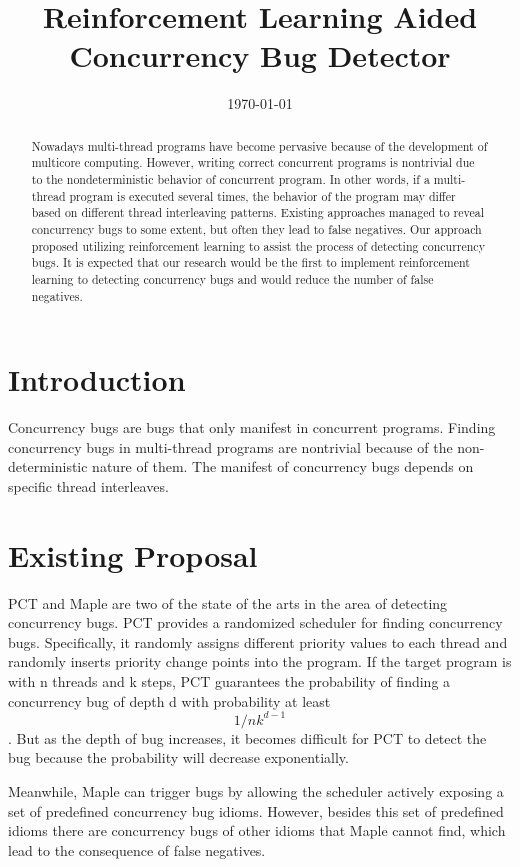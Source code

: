 \documentclass[twocolumn]{article}
\title{Reinforcement Learning Aided Concurrency Bug Detector}
\date{\today}
\begin{document}
\maketitle

\begin{abstract}
Nowadays multi-thread programs have become pervasive because of the development of multicore computing. However, writing correct concurrent programs is nontrivial due to the nondeterministic behavior of concurrent program. In other words, if a multi-thread program is executed several times, the behavior of the program may differ based on different thread interleaving patterns. Existing approaches managed to reveal concurrency bugs to some extent, but often they lead to false negatives. Our approach proposed utilizing reinforcement learning to assist the process of detecting concurrency bugs. It is expected that our research would be the first to implement reinforcement learning to detecting concurrency bugs and would reduce the number of false negatives. 
\end{abstract}

\section{Introduction}
Concurrency bugs are bugs that only manifest in concurrent programs. Finding concurrency bugs in multi-thread programs are nontrivial because of the non-deterministic nature of them. The manifest of concurrency bugs depends on specific thread interleaves. 

\section{Existing Proposal}
PCT and Maple are two of the state of the arts in the area of detecting concurrency bugs. PCT provides a randomized scheduler for finding concurrency bugs. Specifically, it randomly assigns different priority values to each thread and randomly inserts priority change points into the program. If the target program is with n threads and k steps, PCT guarantees the probability of finding a concurrency bug of depth d with probability at least \[1/nk^{d-1}\]. But as the depth of bug increases, it becomes difficult for PCT to detect the bug because the probability will decrease exponentially. \par
Meanwhile, Maple can trigger bugs by allowing the scheduler actively exposing a set of predefined concurrency bug idioms. However, besides this set of predefined idioms there are concurrency bugs of other idioms that Maple cannot find, which lead to the consequence of false negatives. 
\end{document}

